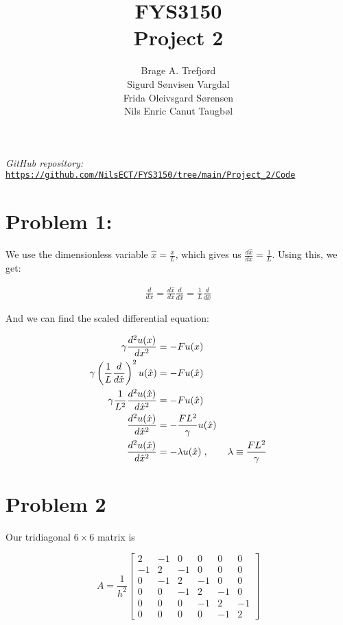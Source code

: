 \documentclass[english,notitlepage]{article}  %
\title{FYS3150\\Project 2}
\author{Brage A. Trefjord\\Sigurd Sønvisen Vargdal\\Frida Oleivsgard Sørensen\\Nils Enric Canut Taugbøl}
\begin{document}
\maketitle
\textit{GitHub repository:} \texttt{\url{https://github.com/NilsECT/FYS3150/tree/main/Project_2/Code}}


\section*{Problem 1:}

We use the dimensionless variable $\hat{x} = \frac{x}{L}$, which gives us
$\frac{d \hat{x}}{dx} = \frac{1}{L}$. Using this, we get:

\begin{align*}
    \frac{d}{dx} = \frac{d\hat{x}}{dx} \frac{d}{d\hat{x}} = \frac{1}{L} \frac{d}{d\hat{x}}
\end{align*}

And we can find the scaled differential equation:

\begin{align*}
    \gamma \frac{d^2 u(x)}{dx^2} &= -F u(x)
    \\
    \gamma \left( \frac{1}{L} \frac{d}{d\hat{x}} \right)^2 u(\hat{x}) &= -F u(\hat{x})
    \\
    \gamma \frac{1}{L^2} \frac{d^2 u(\hat{x})}{d \hat{x}^2} &= -F u(\hat{x})
    \\
    \frac{d^2 u(\hat{x})}{d \hat{x}^2} &= - \frac{F L^2}{\gamma} u(\hat{x})
    \\
    \frac{d^2 u(\hat{x})}{d \hat{x}^2} &= - \lambda u(\hat{x}) \; , \hspace*{20pt} \lambda \equiv \frac{F L^2}{\gamma}
\end{align*}


\section*{Problem 2}

Our tridiagonal $6 \times 6$ matrix is

\begin{equation*}
    A = \frac{1}{h^2} \begin{bmatrix}
        2 & -1 & 0 & 0 & 0 & 0 \\
        -1 & 2 & -1 & 0 & 0 & 0 \\
        0 & -1 & 2 & -1 & 0 & 0 \\
        0 & 0 & -1 & 2 & -1 & 0 \\
        0 & 0 & 0 & -1 & 2 & -1 \\
        0 & 0 & 0 & 0 & -1 & 2
    \end{bmatrix}
\end{equation*}
\end{document}
